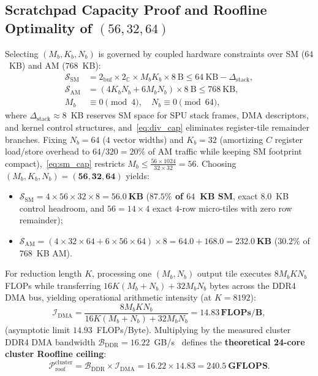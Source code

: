 \documentclass[conference]{IEEEtran}
\begin{document}
\subsection{Scratchpad Capacity Proof and Roofline Optimality of $(56, 32, 64)$}
Selecting $(M_b, K_b, N_b)$ is governed by coupled hardware constraints over SM ($64$~KB) and AM ($768$~KB):
\begin{subequations}
\begin{align}
\mathcal{S}_{\mathrm{SM}} &= 2_{\mathrm{buf}} \times 2_{\mathbb{C}} \times M_b K_b \times 8~\text{B} \le 64~\text{KB} - \Delta_{\mathrm{stack}}, \label{eq:sm_cap} \\
\mathcal{S}_{\mathrm{AM}} &= \left(4 K_b N_b + 6 M_b N_b\right) \times 8~\text{B} \le 768~\text{KB}, \label{eq:am_cap} \\
M_b &\equiv 0 \pmod 4, \quad N_b \equiv 0 \pmod{64}, \label{eq:div_cap}
\end{align}
\end{subequations}
where $\Delta_{\mathrm{stack}} \approx 8$~KB reserves SM space for SPU stack frames, DMA descriptors, and kernel control structures, and~\eqref{eq:div_cap} eliminates register-tile remainder branches. Fixing $N_b = 64$ ($4$ vector widths) and $K_b = 32$ (amortizing $C$ register load/store overhead to $64/320 = 20\%$ of AM traffic while keeping SM footprint compact),~\eqref{eq:sm_cap} restricts $M_b \le \frac{56 \times 1024}{32 \times 32} = 56$. Choosing $(M_b, K_b, N_b) = \mathbf{(56, 32, 64)}$ yields:
\begin{itemize}\setlength{\itemsep}{1pt}\setlength{\parskip}{0pt}
    \item $\mathcal{S}_{\mathrm{SM}} = 4 \times 56 \times 32 \times 8 = \mathbf{56.0~\text{KB}}$ (\textbf{$87.5\%$ of $64$~KB SM}, exact $8.0$~KB control headroom, and $56 = 14 \times 4$ exact $4$-row micro-tiles with zero row remainder);
    \item $\mathcal{S}_{\mathrm{AM}} = (4 \times 32 \times 64 + 6 \times 56 \times 64) \times 8 = 64.0 + 168.0 = \mathbf{232.0~\text{KB}}$ ($30.2\%$ of $768$~KB AM).
\end{itemize}

For reduction length $K$, processing one $(M_b, N_b)$ output tile executes $8 M_b K N_b$ FLOPs while transferring $16 K (M_b + N_b) + 32 M_b N_b$ bytes across the DDR4 DMA bus, yielding operational arithmetic intensity (at $K=8192$):
\begin{equation}
\mathcal{I}_{\mathrm{DMA}} = \frac{8 M_b K N_b}{16 K (M_b + N_b) + 32 M_b N_b} = \mathbf{14.83\,\text{FLOPs/B}},
\label{eq:ai_dma}
\end{equation}
(asymptotic limit $14.93$~FLOPs/Byte). Multiplying by the measured cluster DDR4 DMA bandwidth $\mathcal{B}_{\mathrm{DDR}} = 16.22$~GB/s~\cite{qi2025constraint} defines the \textbf{theoretical 24-core cluster Roofline ceiling}:
\begin{equation}
\mathcal{P}_{\mathrm{roof}}^{\mathrm{cluster}} = \mathcal{B}_{\mathrm{DDR}} \times \mathcal{I}_{\mathrm{DMA}} = 16.22 \times 14.83 = \mathbf{240.5~\text{GFLOPS}}.
\label{eq:cluster_roofline}
\end{equation}
\end{document}
